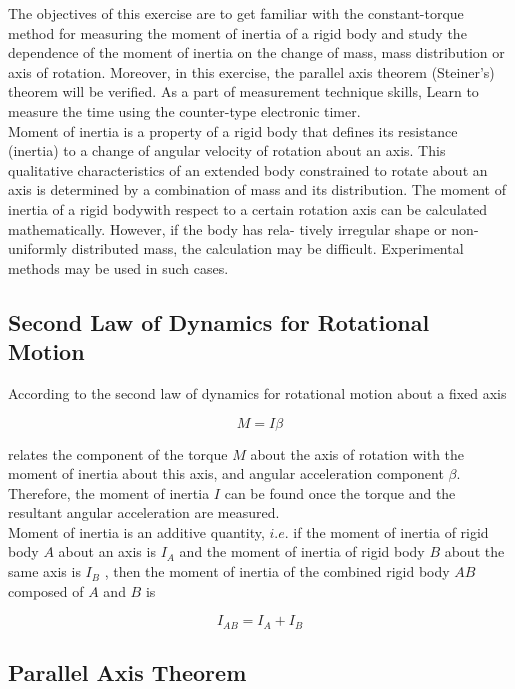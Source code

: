 \documentclass{article}
\begin{document}
The objectives of this exercise are to get familiar with the constant-torque method for
measuring the moment of inertia of a rigid body and study the dependence of the moment
of inertia on the change of mass, mass distribution or axis of rotation. Moreover, in this
exercise, the parallel axis theorem (Steiner’s) theorem will be verified.
As a part of measurement technique skills, Learn to measure the time using the
counter-type electronic timer.
\\

Moment of inertia is a property of a rigid body that defines its resistance (inertia) to
a change of angular velocity of rotation about an axis. This qualitative characteristics of
an extended body constrained to rotate about an axis is determined by a combination
of mass and its distribution. The moment of inertia of a rigid bodywith respect to a
certain rotation axis can be calculated mathematically. However, if the body has rela-
tively irregular shape or non-uniformly distributed mass, the calculation may be difficult.
Experimental methods may be used in such cases.

\subsection{Second Law of Dynamics for Rotational Motion}

According to the second law of dynamics for rotational motion about a fixed axis

\begin{equation}\label{eq-1}
M=I\beta
\end{equation}

relates the component of the torque $M$ about the axis of rotation with the moment of
inertia about this axis, and angular acceleration component $\beta$. Therefore, the moment
of inertia $I$ can be found once the torque and the resultant angular acceleration are
measured.\\

Moment of inertia is an additive quantity, $i.e$. if the moment of inertia of rigid body
$A$ about an axis is $I_A$ and the moment of inertia of rigid body $B$ about the same axis is
$I_B$ , then the moment of inertia of the combined rigid body $AB$ composed of $A$ and $B$ is

$$I_{AB}=I_A+I_B$$

\subsection{Parallel Axis Theorem}
\end{document}
